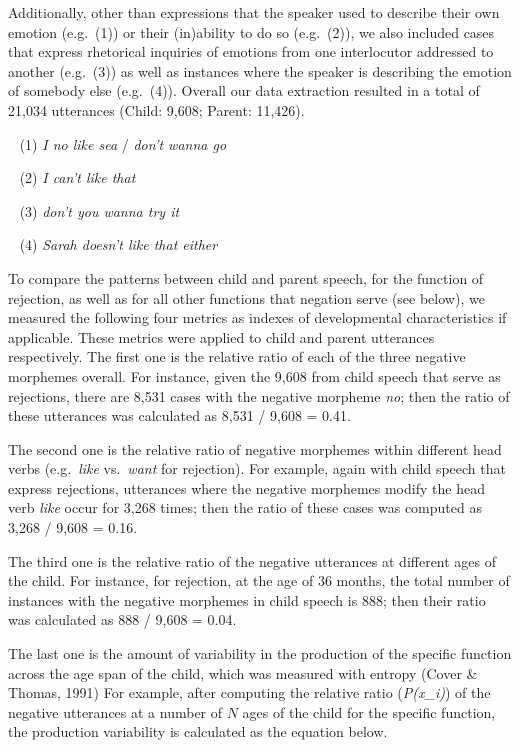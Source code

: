 \documentclass[10pt, letterpaper]{article}
\begin{document}
Additionally, other than expressions that the speaker used to describe
their own emotion (e.g.~(1)) or their (in)ability to do so (e.g.~(2)),
we also included cases that express rhetorical inquiries of emotions
from one interlocutor addressed to another (e.g.~(3)) as well as
instances where the speaker is describing the emotion of somebody else
(e.g.~(4)). Overall our data extraction resulted in a total of 21,034
utterances (Child: 9,608; Parent: 11,426).

~ (1) \emph{I no like sea} / \emph{don't wanna go}

~ (2) \emph{I can't like that}

~ (3) \emph{don't you wanna try it}

~ (4) \emph{Sarah doesn't like that either}

To compare the patterns between child and parent speech, for the
function of rejection, as well as for all other functions that negation
serve (see below), we measured the following four metrics as indexes of
developmental characteristics if applicable. These metrics were applied
to child and parent utterances respectively. The first one is the
relative ratio of each of the three negative morphemes overall. For
instance, given the 9,608 from child speech that serve as rejections,
there are 8,531 cases with the negative morpheme \emph{no}; then the
ratio of these utterances was calculated as 8,531 / 9,608 = 0.41.

The second one is the relative ratio of negative morphemes within
different head verbs (e.g.~\emph{like} vs.~\emph{want} for rejection).
For example, again with child speech that express rejections, utterances
where the negative morphemes modify the head verb \emph{like} occur for
3,268 times; then the ratio of these cases was computed as 3,268 / 9,608
= 0.16.

The third one is the relative ratio of the negative utterances at
different ages of the child. For instance, for rejection, at the age of
36 months, the total number of instances with the negative morphemes in
child speech is 888; then their ratio was calculated as 888 / 9,608 =
0.04.

The last one is the amount of variability in the production of the
specific function across the age span of the child, which was measured
with entropy (Cover \& Thomas, 1991) For example, after computing the
relative ratio (\emph{P(x\_i)}) of the negative utterances at a number
of \(N\) ages of the child for the specific function, the production
variability is calculated as the equation below.
\end{document}
